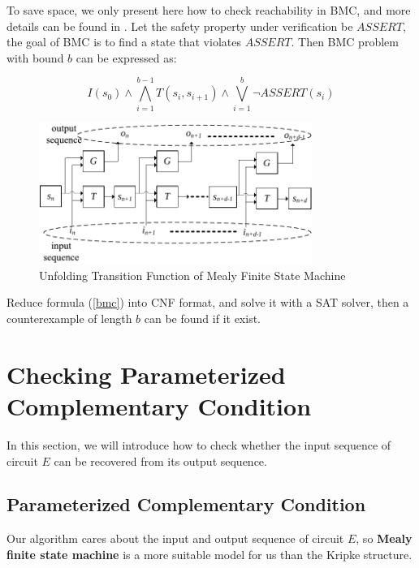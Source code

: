 \documentclass[journal]{IEEEtran}
\begin{document}
To save space,
we only present here how to check reachability in BMC,
and more details can be found in \cite{SMCSAT}.
Let the safety property under verification be $ASSERT$,
the goal of BMC is to find a state that violates $ASSERT$.
Then BMC problem with bound $b$ can be expressed as:

\begin{equation}\label{bmc}
I(s_0)\wedge \bigwedge_{i=1}^{b-1} T(s_i,s_{i+1})\wedge \bigvee_{i=1}^{b}\neg ASSERT(s_i)
\end{equation}

\begin{figure}[t]
\centering
\includegraphics[width=3.5in]{mealy}
\caption{Unfolding Transition Function of Mealy Finite State Machine}
\label{mealyfsm_unfolding}
\end{figure}

Reduce formula (\ref{bmc}) into CNF format,
and solve it with a SAT solver,
then a counterexample of length $b$ can be found if it exist.

\section{Checking Parameterized Complementary Condition}\label{sec_checkUA}

In this section,
we will introduce how to check whether the input sequence of circuit $E$ can be recovered from its output sequence.

\subsection{Parameterized Complementary Condition}

Our algorithm cares about the input and output sequence of circuit $E$,
so \textbf{Mealy finite state machine}\cite{MEALY} is a more suitable model for us than the Kripke structure.

\vspace{0.2cm}
\end{document}
